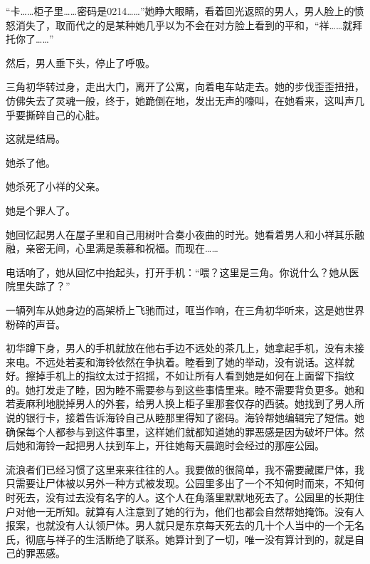 \documentclass{article}
\begin{document}
“卡……柜子里……密码是0214……”她睁大眼睛，看着回光返照的男人，男人脸上的愤怒消失了，取而代之的是某种她几乎以为不会在对方脸上看到的平和，“祥……就拜托你了……”



然后，男人垂下头，停止了呼吸。



三角初华转过身，走出大门，离开了公寓，向着电车站走去。她的步伐歪歪扭扭，仿佛失去了灵魂一般，终于，她跪倒在地，发出无声的嚎叫，在她看来，这叫声几乎要撕碎自己的心脏。



这就是结局。



她杀了他。



她杀死了小祥的父亲。



她是个罪人了。



她回忆起男人在屋子里和自己用树叶合奏小夜曲的时光。她看着男人和小祥其乐融融，亲密无间，心里满是羡慕和祝福。而现在……



电话响了，她从回忆中抬起头，打开手机：“喂？这里是三角。你说什么？她从医院里失踪了？”



一辆列车从她身边的高架桥上飞驰而过，哐当作响，在三角初华听来，这是她世界粉碎的声音。



\newpage



初华蹲下身，男人的手机就放在他右手边不远处的茶几上，她拿起手机，没有未接来电。不远处若麦和海铃依然在争执着。睦看到了她的举动，没有说话。这样就好。擦掉手机上的指纹太过于招摇，不如让所有人看到她是如何在上面留下指纹的。她打发走了睦，因为睦不需要参与到这些事情里来。睦不需要背负更多。她和若麦麻利地脱掉男人的外套，给男人换上柜子里那套仅存的西装。她找到了男人所说的银行卡，接着告诉海铃自己从睦那里得知了密码。海铃帮她编辑完了短信。她确保每个人都参与到这件事里，这样她们就都知道她的罪恶感是因为破坏尸体。然后她和海铃一起把男人扶到车上，开往她每天晨跑时会经过的那座公园。



流浪者们已经习惯了这里来来往往的人。我要做的很简单，我不需要藏匿尸体，我只需要让尸体被以另外一种方式被发现。公园里多出了一个不知何时而来，不知何时死去，没有过去没有名字的人。这个人在角落里默默地死去了。公园里的长期住户对他一无所知。就算有人注意到了她的行为，他们也都会自然帮她掩饰。没有人报案，也就没有人认领尸体。男人就只是东京每天死去的几十个人当中的一个无名氏，彻底与祥子的生活断绝了联系。她算计到了一切，唯一没有算计到的，就是自己的罪恶感。
\end{document}
